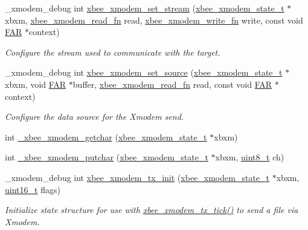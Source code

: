 \begin{DoxyCompactItemize}
\+\_\+xmodem\+\_\+debug int \hyperlink{group__util__xmodem_ga3153bea635e130326e96720fe354852d}{xbee\+\_\+xmodem\+\_\+set\+\_\+stream} (\hyperlink{structxbee__xmodem__state__t}{xbee\+\_\+xmodem\+\_\+state\+\_\+t} $\ast$xbxm, \hyperlink{group__util__xmodem_ga25f49dbd4c2f9e274a32217a709d6382}{xbee\+\_\+xmodem\+\_\+read\+\_\+fn} read, \hyperlink{group__util__xmodem_ga57f329cc7f4e1b18f5baddb888221d7f}{xbee\+\_\+xmodem\+\_\+write\+\_\+fn} write, const void \hyperlink{group__hal_gaef060b3456fdcc093a7210a762d5f2ed}{F\+AR} $\ast$context)
\begin{DoxyCompactList}\small\item\em Configure the stream used to communicate with the target. \end{DoxyCompactList}\item 
\+\_\+xmodem\+\_\+debug int \hyperlink{group__util__xmodem_gaa71f0823f6fc8db3f7c556819079b225}{xbee\+\_\+xmodem\+\_\+set\+\_\+source} (\hyperlink{structxbee__xmodem__state__t}{xbee\+\_\+xmodem\+\_\+state\+\_\+t} $\ast$xbxm, void \hyperlink{group__hal_gaef060b3456fdcc093a7210a762d5f2ed}{F\+AR} $\ast$buffer, \hyperlink{group__util__xmodem_ga25f49dbd4c2f9e274a32217a709d6382}{xbee\+\_\+xmodem\+\_\+read\+\_\+fn} read, const void \hyperlink{group__hal_gaef060b3456fdcc093a7210a762d5f2ed}{F\+AR} $\ast$context)
\begin{DoxyCompactList}\small\item\em Configure the data source for the Xmodem send. \end{DoxyCompactList}\item 
int \hyperlink{group__util__xmodem_gac01df75671906e590a9ed9b0a4644ba1}{\+\_\+xbee\+\_\+xmodem\+\_\+getchar} (\hyperlink{structxbee__xmodem__state__t}{xbee\+\_\+xmodem\+\_\+state\+\_\+t} $\ast$xbxm)
\item 
int \hyperlink{group__util__xmodem_ga0cc061cd92dfa4eba4720b2839698545}{\+\_\+xbee\+\_\+xmodem\+\_\+putchar} (\hyperlink{structxbee__xmodem__state__t}{xbee\+\_\+xmodem\+\_\+state\+\_\+t} $\ast$xbxm, \hyperlink{group__hal__dos_gae1affc9ca37cfb624959c866a73f83c2}{uint8\+\_\+t} ch)
\item 
\+\_\+xmodem\+\_\+debug int \hyperlink{group__util__xmodem_gabc8da474bce7043eef3537bd492c5123}{xbee\+\_\+xmodem\+\_\+tx\+\_\+init} (\hyperlink{structxbee__xmodem__state__t}{xbee\+\_\+xmodem\+\_\+state\+\_\+t} $\ast$xbxm, \hyperlink{group__hal__dos_ga5a8b2dc9e45a9ee81a94ef304fb62505}{uint16\+\_\+t} flags)
\begin{DoxyCompactList}\small\item\em Initialize state structure for use with \hyperlink{group__util__xmodem_ga1de6d8cc3628767d877e854f92ab2b0e}{xbee\+\_\+xmodem\+\_\+tx\+\_\+tick()} to send a file via Xmodem. \end{DoxyCompactList}\item 

\end{DoxyCompactItemize}
